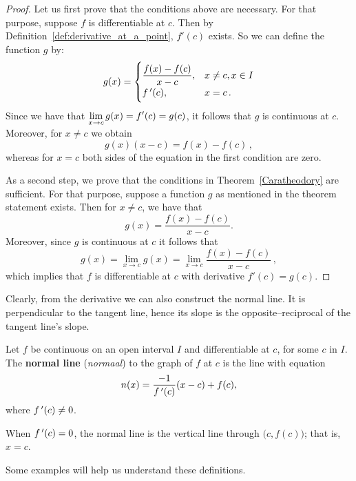 \begin{proof}
Let us first prove that the conditions above are necessary. For that purpose, suppose $f$ is differentiable at $c$. Then by Definition~\ref{def:derivative_at_a_point}, $f'(c)$ exists. So we can define the function $g$ by: 
$$
g(x) = \begin{cases}
\dfrac {f(x) - f(c)} {x - c}, &  x \ne c, x \in I \\
f\,'(c), &  x = c\,.
\end{cases}
$$
Since we have that $\displaystyle\lim_{x \rightarrow c}g(x) = f'(c) = g(c)$, it follows that  $g$ is continuous at $c$. Moreover, for  $x \neq c$ we obtain
$$
g(x)(x-c) = f(x) - f(c)\,,
$$
whereas for $x = c$ both sides of the equation in the first condition are zero.

As a second step, we prove that the conditions in Theorem~\ref{Caratheodory} are sufficient. For that purpose, suppose a function $g$ as mentioned in the theorem statement exists. Then for $x\neq c$, we have that 
$$
g(x) = \frac{f(x)-f(c)}{x-c}.
$$
Moreover, since $g$ is continuous at $c$ it follows that 
$$
\displaystyle g(x) = \lim_{x \to c} g(x) = \lim_{x \to c} \frac {f (x) - f (c)} {x - c}\,,
$$
which implies that $f$ is differentiable at $c$ with  derivative $f'(c) = g(c)$.
\end{proof}


\fi
\fi


Clearly, from the derivative we can also construct the normal line. It is perpendicular to the tangent line, hence its slope is the opposite--reciprocal of the tangent line's slope.

\begin{definition}\label{def:normal_line}
Let $f$ be continuous on an open interval $I$ and differentiable at $c$, for some $c$ in $I$. The \textbf{normal line} (\textit{normaal}) to the graph of $f$ at $c$ is the line with equation
$$
n(x) =\frac{-1}{f\,'(c)}(x-c)+f(c),
$$ where $f\,'(c)\neq 0$. 
\end{definition}
When $f\,'(c)=0$, the normal line is the vertical line through $\big(c,f(c)\big)$; that is, $x=c$.



Some examples will help us understand these definitions.


